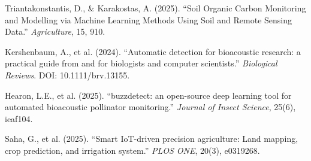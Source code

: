 \documentclass[10pt,a4paper]{article}
\begin{document}
\noindent [15] Triantakonstantis, D., \& Karakostas, A. (2025). ``Soil Organic Carbon Monitoring and Modelling via Machine Learning Methods Using Soil and Remote Sensing Data.'' \textit{Agriculture}, 15, 910.

\noindent [16] Kershenbaum, A., et al. (2024). ``Automatic detection for bioacoustic research: a practical guide from and for biologists and computer scientists.'' \textit{Biological Reviews}. DOI: 10.1111/brv.13155.

\noindent [17] Hearon, L.E., et al. (2025). ``buzzdetect: an open-source deep learning tool for automated bioacoustic pollinator monitoring.'' \textit{Journal of Insect Science}, 25(6), ieaf104.

\noindent [21] Saha, G., et al. (2025). ``Smart IoT-driven precision agriculture: Land mapping, crop prediction, and irrigation system.'' \textit{PLOS ONE}, 20(3), e0319268.
\end{document}
